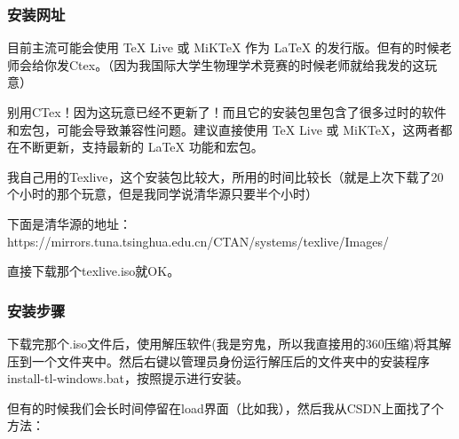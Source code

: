 \subsubsection{安装网址}
目前主流可能会使用 TeX Live 或 MiKTeX 作为 \LaTeX{} 的发行版。但有的时候老师会给你发Ctex。（因为我国际大学生物理学术竞赛的时候老师就给我发的这玩意）

别用CTex！因为这玩意已经不更新了！而且它的安装包里包含了很多过时的软件和宏包，可能会导致兼容性问题。建议直接使用 TeX Live 或 MiKTeX，这两者都在不断更新，支持最新的 \LaTeX{} 功能和宏包。

我自己用的Texlive，这个安装包比较大，所用的时间比较长（就是上次下载了20个小时的那个玩意，但是我同学说清华源只要半个小时）

下面是清华源的地址：https://mirrors.tuna.tsinghua.edu.cn/CTAN/systems/texlive/Images/

直接下载那个texlive.iso就OK。

\subsubsection{安装步骤}
下载完那个.iso文件后，使用解压软件(我是穷鬼，所以我直接用的360压缩)将其解压到一个文件夹中。然后右键以管理员身份运行解压后的文件夹中的安装程序install-tl-windows.bat，按照提示进行安装。

但有的时候我们会长时间停留在load界面（比如我），然后我从CSDN上面找了个方法：

